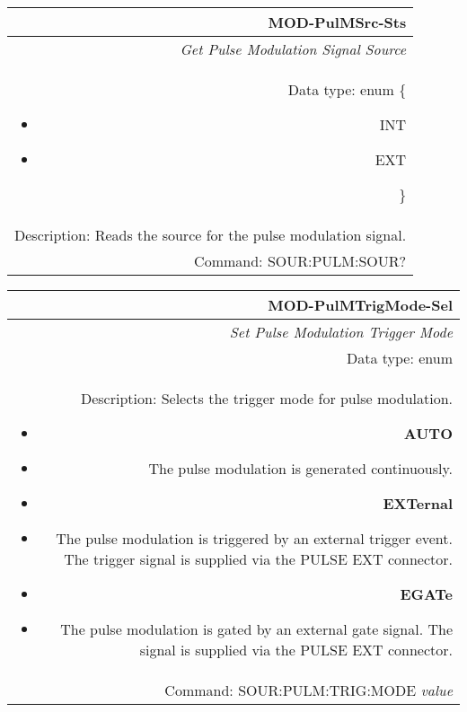 \documentclass[openany]{article}
\begin{document}
		\begin{tabular}{N}
			\hline
			\bfseries MOD-PulMSrc-Sts \\ \hline
			\emph{Get Pulse Modulation Signal Source} \\
			Data type: enum \{\begin{itemize}[noitemsep]
				\small
				\item[] INT
				\item[] EXT
			\end{itemize}\} \\ 
			Description: Reads the source for the pulse modulation signal. \\
			Command: SOUR:PULM:SOUR? \\

		\end{tabular}
%
		\begin{tabular}{N}
			\hline
			\bfseries MOD-PulMTrigMode-Sel \\ \hline
			\emph{Set Pulse Modulation Trigger Mode} \\
			Data type: enum \\  
			Description: Selects the trigger mode for pulse modulation. \begin{itemize}[noitemsep]
				\small
				\item[] \textbf{AUTO}
                                \item[] The pulse modulation is generated continuously.
                                \item[] \textbf{EXTernal}
                                \item[] The pulse modulation is triggered by an external trigger event. The trigger signal is supplied via the PULSE EXT connector.
				\item[] \textbf{EGATe}
				\item[] The pulse modulation is gated by an external gate signal. The signal is supplied via the PULSE EXT connector.
			\end{itemize} \\
			Command: SOUR:PULM:TRIG:MODE \emph{value} \\

		\end{tabular}
\end{document}
